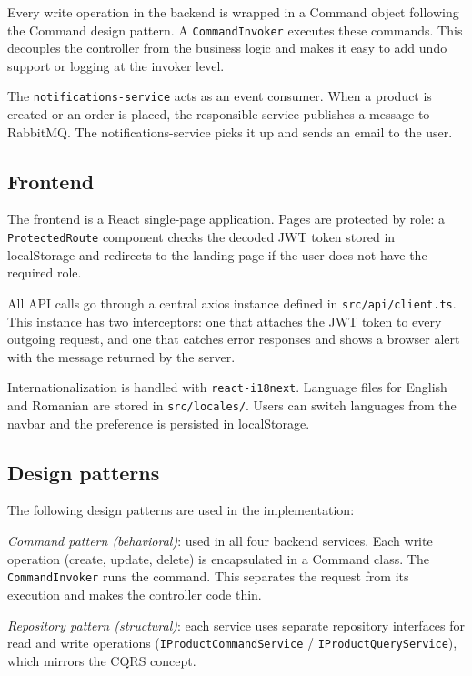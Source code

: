 \documentclass[12pt, a4paper]{article}
\begin{document}
Every write operation in the backend is wrapped in a Command object following the Command
design pattern. A \texttt{CommandInvoker} executes these commands. This decouples the controller
from the business logic and makes it easy to add undo support or logging at the invoker level.

The \texttt{notifications-service} acts as an event consumer. When a product is created or an
order is placed, the responsible service publishes a message to RabbitMQ. The
notifications-service picks it up and sends an email to the user.

\subsection{Frontend}

The frontend is a React single-page application. Pages are protected by role: a
\texttt{ProtectedRoute} component checks the decoded JWT token stored in localStorage and
redirects to the landing page if the user does not have the required role.

All API calls go through a central axios instance defined in \texttt{src/api/client.ts}. This
instance has two interceptors: one that attaches the JWT token to every outgoing request, and
one that catches error responses and shows a browser alert with the message returned by the
server.

Internationalization is handled with \texttt{react-i18next}. Language files for English and
Romanian are stored in \texttt{src/locales/}. Users can switch languages from the navbar
and the preference is persisted in localStorage.

\subsection{Design patterns}

The following design patterns are used in the implementation:

\textit{Command pattern (behavioral)}: used in all four backend services. Each write operation
(create, update, delete) is encapsulated in a Command class. The \texttt{CommandInvoker} runs
the command. This separates the request from its execution and makes the controller code thin.

\textit{Repository pattern (structural)}: each service uses separate repository interfaces for
read and write operations (\texttt{IProductCommandService} / \texttt{IProductQueryService}), which
mirrors the CQRS concept.
\end{document}
